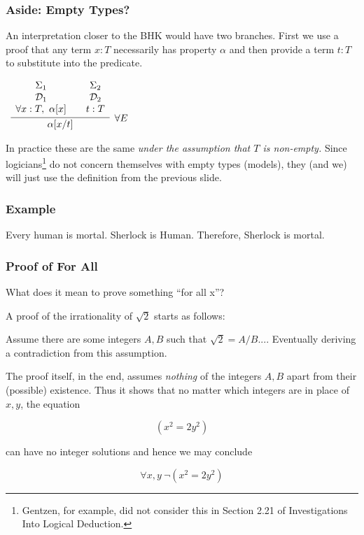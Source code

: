 \documentclass{beamer}
\theoremstyle{indentDefn} \newtheorem{defn}[]{Definition}
\begin{document}
\begin{frame}
	\frametitle{Aside: Empty Types?}

	An interpretation closer to the BHK would have two branches. First we use a proof that any term $x : T$ necessarily has property $\alpha$ and then provide a term $t : T$ to substitute into the predicate.  

	\begin{center}
		$\begin{array}{c}
			\infer[\forall E]{\alpha[x/t]}
				{\begin{array}{c} 
					\Sigma_{1} \\
					\mathcal{D}_{1} \\ 
					\forall x : T, \ \alpha[x]	
					\end{array}
				&
				\begin{array}{c} 
					\Sigma_{2} \\
					\mathcal{D}_{2} \\ 
					t : T			
					\end{array}}
		\end{array}$
	\end{center}

	In practice these are the same \emph{under the assumption that $T$ is non-empty.} Since logicians\footnote{Gentzen, for example, did not consider this in Section 2.21 of Investigations Into Logical Deduction.} do not concern themselves with empty types (models), they (and we) will just use the definition from the previous slide. 

\end{frame}

\begin{frame}
	\frametitle{Example}
	
	Every human is mortal. Sherlock is Human. Therefore, Sherlock is mortal. 
	
	\vspace{6cm}
	
\end{frame}

\begin{frame}
	\frametitle{Proof of For All}
	
	What does it mean to prove something ``for all x''?
	
	A proof of the irrationality of $\sqrt{2}$ starts as follows: 
	
	\begin{center}
		Assume there are some integers $A,B$ such that $\sqrt{2} = A/B$.... Eventually deriving a contradiction from this assumption.
	\end{center}
	
	The proof itself, in the end, assumes \emph{nothing} of the integers $A,B$ apart from their (possible) existence. Thus it shows that no matter which integers are in place of $x,y$, the equation 
	
	$$(x^{2} = 2y^{2})$$
	
	can have no integer solutions and hence we may conclude 
	
	$$\forall x,y \ \lnot (x^{2} = 2y^{2})$$
	
\end{frame}
\end{document}
